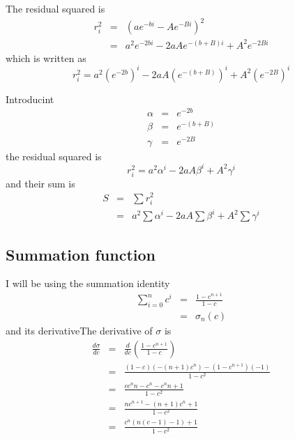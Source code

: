 \documentclass{article}
\begin{document}
The residual squared is%
\begin{eqnarray}
r_{i}^{2} &=&\left( ae^{-bi}-Ae^{-Bi}\right) ^{2} \\
&=&a^{2}e^{-2bi}-2aAe^{-\left( b+B\right) i}+A^{2}e^{-2Bi}
\end{eqnarray}%
which is written as%
\begin{equation}
r_{i}^{2}=a^{2}\left( e^{-2b}\right) ^{i}-2aA\left( e^{-\left( b+B\right)
}\right) ^{i}+A^{2}\left( e^{-2B}\right) ^{i}
\end{equation}

Introducint%
\begin{eqnarray}
\alpha  &=&e^{-2b}  \label{def:alpha} \\
\beta  &=&e^{-\left( b+B\right) }  \label{def:beta} \\
\gamma  &=&e^{-2B}  \label{def:gamma}
\end{eqnarray}%
the residual squared is%
\begin{equation}
r_{i}^{2}=a^{2}\alpha ^{i}-2aA\beta ^{i}+A^{2}\gamma ^{i}
\label{eq:r_i^2(alpha,beta,gamma)}
\end{equation}%
and their sum is%
\begin{eqnarray}
S &=&\sum r_{i}^{2} \\
&=&a^{2}\sum \alpha ^{i}-2aA\sum \beta ^{i}+A^{2}\sum \gamma ^{i}
\label{eq:S}
\end{eqnarray}

\subsection{Summation function}

I will be using the summation identity%
\begin{eqnarray}
\sum_{i=0}^{n}c^{i} &=&\frac{1-c^{n+1}}{1-c} \\
&=&\sigma _{n}\left( c\right)   \label{def:sigma-fun}
\end{eqnarray}%
and its derivativeThe derivative of $\sigma $ is%
\begin{eqnarray}
\frac{d\sigma }{dc} &=&\frac{d}{dc}\left( \frac{1-c^{n+1}}{1-c}\right)  \\
&=&\frac{\left( 1-c\right) \left( -\left( n+1\right) c^{n}\right) -\left(
1-c^{n+1}\right) \left( -1\right) }{1-c^{2}} \\
&=&\frac{cc^{n}n-c^{n}-c^{n}n+1}{1-c^{2}} \\
&=&\frac{nc^{n+1}-\left( n+1\right) c^{n}+1}{1-c^{2}} \\
&=&\frac{c^{n}\left( n\left( c-1\right) -1\right) +1}{1-c^{2}}
\label{eq:sigma'}
\end{eqnarray}
\end{document}
